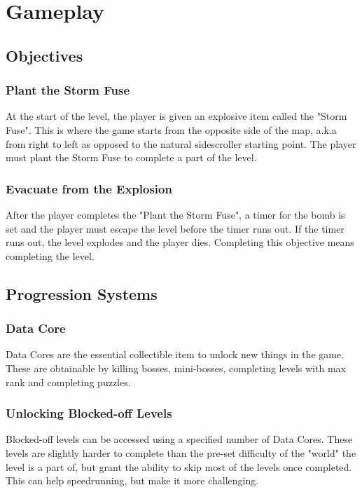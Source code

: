 \documentclass[12pt]{article}
\begin{document}
\section{Gameplay}

\subsection{Objectives}

\subsubsection{Plant the Storm Fuse}

At the start of the level, the player is given an explosive item called the "Storm Fuse". This is where the game starts from the  opposite side of the map, a.k.a from right to left as opposed to the natural sidescroller starting point. The player must plant the Storm Fuse to complete a part of the level. 

\subsubsection{Evacuate from the Explosion}

After the player completes the "Plant the Storm Fuse", a timer for the bomb is set and the player must escape the level before the timer runs out. If the timer runs out, the level explodes and the player dies. Completing this objective means completing the level. 

\subsection{Progression Systems}

\subsubsection{Data Core}

Data Cores are the essential collectible item to unlock new things in the game. These are obtainable by killing bosses, mini-bosses, completing levels with max rank and completing puzzles. 

\subsubsection{Unlocking Blocked-off Levels}

Blocked-off levels can be accessed using a specified number of Data Cores. These levels are slightly harder to complete than the pre-set difficulty of the "world" the level is a part of, but grant the ability to skip most of the levels once completed. This can help speedrunning, but make it more challenging. 
\end{document}
